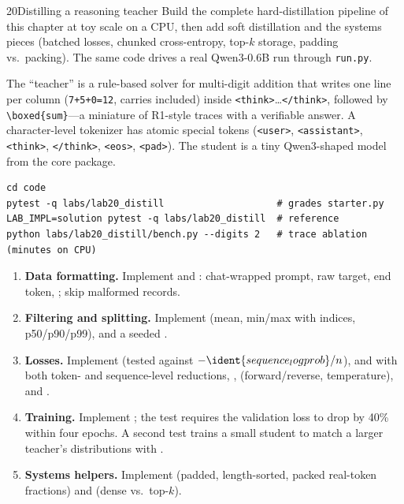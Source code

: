 \begin{labbox}{20}{Distilling a reasoning teacher}
Build the complete hard-distillation pipeline of this chapter at toy scale on a CPU, then add
soft distillation and the systems pieces (batched losses, chunked cross-entropy, top-$k$ storage,
padding vs.\ packing). The same code drives a real Qwen3-0.6B run through \texttt{run.py}.

The ``teacher'' is a rule-based solver for multi-digit addition that writes one line per column
(\texttt{7+5+0=12}, carries included) inside \texttt{<think>}\ldots\texttt{</think>}, followed by
\texttt{\textbackslash boxed\{sum\}}---a miniature of R1-style traces with a verifiable answer. A character-level
tokenizer has atomic special tokens (\texttt{<user>}, \texttt{<assistant>}, \texttt{<think>},
\texttt{</think>}, \texttt{<eos>}, \texttt{<pad>}). The student is a tiny Qwen3-shaped model from
the core package.
\begin{lstlisting}[style=shell]
cd code
pytest -q labs/lab20_distill                    # grades starter.py
LAB_IMPL=solution pytest -q labs/lab20_distill  # reference
python labs/lab20_distill/bench.py --digits 2   # trace ablation (minutes on CPU)
\end{lstlisting}

\begin{enumerate}
\item \textbf{Data formatting.} Implement  and
: chat-wrapped prompt, raw target, end token, ;
skip malformed records.
\item \textbf{Filtering and splitting.} Implement  (mean, min/max with
indices, p50/p90/p99),  and a seeded .
\item \textbf{Losses.} Implement  (tested against
$-\ident{sequence_logprob}/n$),  and 
with both token- and sequence-level reductions, ,
 (forward/reverse, temperature),  and .
\item \textbf{Training.} Implement ; the test requires the validation
loss to drop by 40\% within four epochs. A second test trains a small student to match a larger
teacher's distributions with .
\item \textbf{Systems helpers.} Implement  (padded, length-sorted, packed
real-token fractions) and  (dense vs.\ top-$k$).
\end{enumerate}


\end{labbox}
